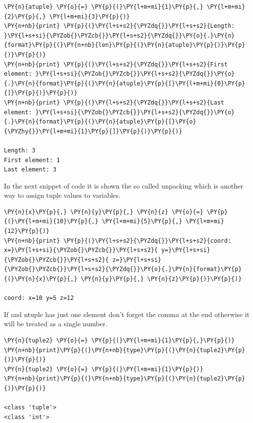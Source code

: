 \begin{tcolorbox}[breakable, size=fbox, boxrule=1pt, pad at break*=1mm, colback=cellbackground, colframe=cellborder]
\begin{Verbatim}[commandchars=\\\{\}]
\PY{n}{atuple} \PY{o}{=} \PY{p}{(}\PY{l+m+mi}{1}\PY{p}{,} \PY{l+m+mi}{2}\PY{p}{,} \PY{l+m+mi}{3}\PY{p}{)}
\PY{n+nb}{print} \PY{p}{(}\PY{l+s+s2}{\PYZdq{}}\PY{l+s+s2}{Length: }\PY{l+s+si}{\PYZob{}\PYZcb{}}\PY{l+s+s2}{\PYZdq{}}\PY{o}{.}\PY{n}{format}\PY{p}{(}\PY{n+nb}{len}\PY{p}{(}\PY{n}{atuple}\PY{p}{)}\PY{p}{)}\PY{p}{)}
\PY{n+nb}{print} \PY{p}{(}\PY{l+s+s2}{\PYZdq{}}\PY{l+s+s2}{First element: }\PY{l+s+si}{\PYZob{}\PYZcb{}}\PY{l+s+s2}{\PYZdq{}}\PY{o}{.}\PY{n}{format}\PY{p}{(}\PY{n}{atuple}\PY{p}{[}\PY{l+m+mi}{0}\PY{p}{]}\PY{p}{)}\PY{p}{)}
\PY{n+nb}{print} \PY{p}{(}\PY{l+s+s2}{\PYZdq{}}\PY{l+s+s2}{Last element: }\PY{l+s+si}{\PYZob{}\PYZcb{}}\PY{l+s+s2}{\PYZdq{}}\PY{o}{.}\PY{n}{format}\PY{p}{(}\PY{n}{atuple}\PY{p}{[}\PY{o}{\PYZhy{}}\PY{l+m+mi}{1}\PY{p}{]}\PY{p}{)}\PY{p}{)}

Length: 3
First element: 1
Last element: 3
\end{Verbatim}
\end{tcolorbox}

In the next snippet of code it is shown the so called unpacking which is another way to assign tuple values to variables.

\begin{tcolorbox}[breakable, size=fbox, boxrule=1pt, pad at break*=1mm, colback=cellbackground, colframe=cellborder]
\begin{Verbatim}[commandchars=\\\{\}]
\PY{n}{x}\PY{p}{,} \PY{n}{y}\PY{p}{,} \PY{n}{z} \PY{o}{=} \PY{p}{(}\PY{l+m+mi}{10}\PY{p}{,} \PY{l+m+mi}{5}\PY{p}{,} \PY{l+m+mi}{12}\PY{p}{)}
\PY{n+nb}{print} \PY{p}{(}\PY{l+s+s2}{\PYZdq{}}\PY{l+s+s2}{coord: x=}\PY{l+s+si}{\PYZob{}\PYZcb{}}\PY{l+s+s2}{ y=}\PY{l+s+si}{\PYZob{}\PYZcb{}}\PY{l+s+s2}{ z=}\PY{l+s+si}{\PYZob{}\PYZcb{}}\PY{l+s+s2}{\PYZdq{}}\PY{o}{.}\PY{n}{format}\PY{p}{(}\PY{n}{x}\PY{p}{,} \PY{n}{y}\PY{p}{,} \PY{n}{z}\PY{p}{)}\PY{p}{)}

coord: x=10 y=5 z=12
\end{Verbatim}
\end{tcolorbox}

If and ntuple has just one element don't forget the comma at the end otherwise it will be treated as a single number.

\begin{tcolorbox}[breakable, size=fbox, boxrule=1pt, pad at break*=1mm, colback=cellbackground, colframe=cellborder]
\begin{Verbatim}[commandchars=\\\{\}]
\PY{n}{tuple2} \PY{o}{=} \PY{p}{(}\PY{l+m+mi}{1}\PY{p}{,}\PY{p}{)}
\PY{n+nb}{print}\PY{p}{(}\PY{n+nb}{type}\PY{p}{(}\PY{n}{tuple2}\PY{p}{)}\PY{p}{)}
\PY{n}{tuple2} \PY{o}{=} \PY{p}{(}\PY{l+m+mi}{1}\PY{p}{)}
\PY{n+nb}{print}\PY{p}{(}\PY{n+nb}{type}\PY{p}{(}\PY{n}{tuple2}\PY{p}{)}\PY{p}{)}

<class 'tuple'>
<class 'int'>
\end{Verbatim}
\end{tcolorbox}


